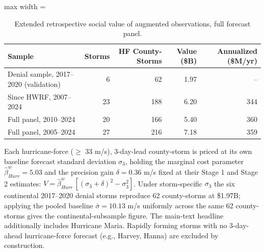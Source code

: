\begin{table}

\caption{Extended retrospective social value of augmented observations, full forecast panel. \label{tab:extended_valuation}}
\centering
\begin{adjustbox}{max width = \textwidth}
\begin{threeparttable}
\begin{tabular}[t]{lrrrr}
\toprule
Sample & Storms & HF County-Storms & Value (\$B) & Annualized (\$M/yr)\\
\midrule
Denial sample, 2017--2020 (validation) & 6 & 62 & 1.97 & --\\
Since HWRF, 2007--2024 & 23 & 188 & 6.20 & 344\\
Full panel, 2010--2024 & 20 & 166 & 5.40 & 360\\
Full panel, 2005--2024 & 27 & 216 & 7.18 & 359\\
\bottomrule
\end{tabular}
\begin{tablenotes}
\small
\item Each hurricane-force ($\geq$ 33 m/s), 3-day-lead county-storm is priced at its own baseline forecast standard deviation $\sigma_3$, holding the marginal cost parameter $\hat{\beta}^{w}_{Hurr} = 5.03$ and the precision gain $\delta = 0.36$ m/s fixed at their Stage 1 and Stage 2 estimates: $V = \hat{\beta}^{w}_{Hurr}\,[(\sigma_3+\delta)^2 - \sigma_3^2]$. Under storm-specific $\sigma_3$ the six continental 2017--2020 denial storms reproduce 62 county-storms at \$1.97B; applying the pooled baseline $\bar{\sigma} = 10.13$ m/s uniformly across the same 62 county-storms gives the continental-subsample figure. The main-text headline additionally includes Hurricane Maria. Rapidly forming storms with no 3-day-ahead hurricane-force forecast (e.g., Harvey, Hanna) are excluded by construction.
\end{tablenotes}
\end{threeparttable}
\end{adjustbox}
\end{table}
